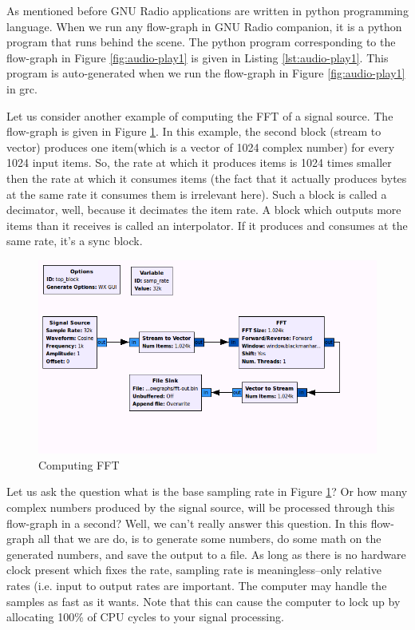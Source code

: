 \documentclass[a4paper,10pt]{article}
\begin{document}
As mentioned before GNU Radio applications are written in python programming language. When we run any flow-graph
in GNU Radio companion, it is a python program that runs behind the scene. The python program corresponding to 
the flow-graph in Figure \ref{fig:audio-play1} is given in Listing \ref{lst:audio-play1}.
This program is auto-generated when we run the flow-graph in Figure \ref{fig:audio-play1} in grc.

Let us consider another example of computing the FFT of a signal source.
The flow-graph is given in Figure \ref{fig:compute-fft}.
In this example, the second block (stream to vector) produces one item(which is a vector of 1024 complex number) for every 1024 input items.
So, the rate at which it produces items is 1024 times smaller then the rate at which it consumes items 
(the fact that it actually produces bytes at the same rate it consumes them is irrelevant here).
Such a block is called a decimator, well, because it decimates the item rate. 
A block which outputs more items than it receives is called an interpolator. 
If it produces and consumes at the same rate, it's a sync block.
\begin{figure}
 \centering
 \includegraphics[scale=0.4]{figures/fft.png}
 \caption{Computing FFT \label{fig:compute-fft}}
\end{figure}

Let us ask the question what is the base sampling rate in Figure \ref{fig:compute-fft}?
Or how many complex numbers produced by the signal source, will be processed through this flow-graph in a second?
Well, we can't really answer this question.
In this flow-graph all that we are do, is to generate some numbers, do some math on the generated numbers, and save the output to a file.
As long as there is no hardware clock present which fixes the rate, 
sampling rate is meaningless--only relative rates (i.e. input to output rates are important. 
The computer may handle the samples as fast as it wants.
Note that this can cause the computer to lock up by allocating 100\% of CPU cycles to your signal processing.
\end{document}
